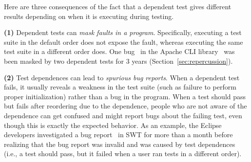Here are three consequences of the fact that a dependent
test gives different results depending on when it is executing
during testing.

\textbf{(1)}
Dependent tests can
\emph{mask faults in a program}. Specifically, executing a test suite in the
default order does not expose the fault, whereas
executing the same test suite in a different order does. 
One bug~\cite{clibug} in the Apache CLI library~\cite{cli}
was been masked by two dependent tests
for 3 years (Section~\ref{sec:repercussion}).

\textbf{(2)}
Test dependences can lead to \emph{spurious bug reports}.
When a dependent test fails, it usually reveals a weakness in the test
suite (such as failure to perform proper initialization) rather than a bug
in the program. 
When a test should pass but
fails after reordering due to the dependence,
people who are not aware of the dependence can get confused
and might report bugs about the failing test,
even though this is exactly the expected behavior.
%
As an example, the Eclipse developers
investigated a bug report~\cite{eclipsebug} in SWT for
more than a month before realizing that the 
bug report was invalid and was caused by test dependences
(i.e., a test should pass, but it failed when a user
ran tests in a different order).
%



